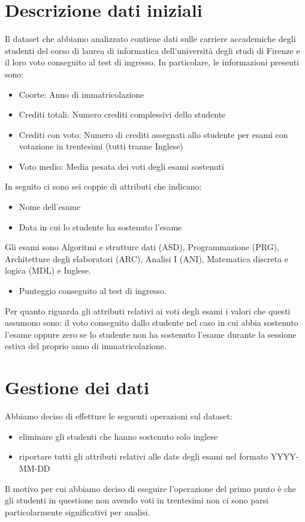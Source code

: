 \documentclass[12pt]{article}
\begin{document}
\section{Descrizione dati iniziali}
Il dataset che abbiamo analizzato contiene dati sulle carriere accademiche degli studenti del corso di laurea di informatica dell'università degli studi di Firenze e il loro voto conseguito 
al test di ingresso. 
In particolare, le informazioni presenti sono:
\begin{itemize}
	\item Coorte: Anno di immatricolazione
	\item Crediti totali: Numero crediti complessivi dello studente
	\item Crediti con voto: Numero di crediti assegnati allo studente per esami con votazione in trentesimi (tutti tranne Inglese)
	\item Voto medio: Media pesata dei voti degli esami sostenuti
\end{itemize}
In seguito ci sono sei coppie di attributi che indicano:
\begin{itemize}
	\item Nome dell'esame
	\item Data in cui lo studente ha sostenuto l'esame
\end{itemize}
Gli esami sono Algoritmi e strutture dati (ASD), Programmazione (PRG), Architetture degli elaboratori (ARC), Analisi I (ANI), Matematica discreta e logica (MDL) e Inglese.
\begin{itemize}
	\item Punteggio conseguito al test di ingresso.
\end{itemize}
Per quanto riguarda gli attributi relativi ai voti degli esami i valori che questi assumono sono:
il voto conseguito dallo studente nel caso in cui abbia sostenuto l'esame oppure
zero se lo studente non ha sostenuto l'esa\-me durante la sessione estiva del proprio anno di immatricolazione.
\newpage
\section{Gestione dei dati}
Abbiamo deciso di effetture le seguenti operazioni sul dataset:
\begin{itemize}
	\item eliminare gli studenti che hanno sostenuto solo inglese
	\item riportare tutti gli attributi relativi alle date degli esami nel formato YYYY-MM-DD
\end{itemize}
Il motivo per cui abbiamo deciso di eseguire l'operazione del primo punto è che gli studenti in questione non avendo voti in trentesimi non ci sono parsi particolarmente significativi per analisi.
\end{document}
